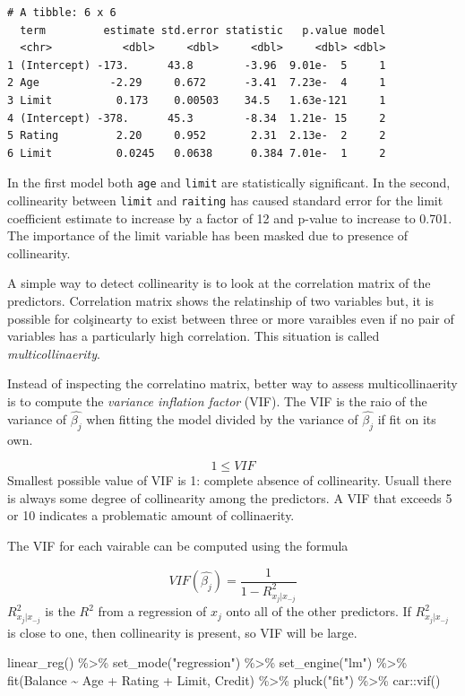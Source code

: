 \documentclass[
  letterpaper,
  DIV=11,
  numbers=noendperiod]{scrreprt}
\newenvironment{Shaded}{\begin{snugshade}}{\end{snugshade}}
\newcommand{\FunctionTok}[1]{\textcolor[rgb]{0.02,0.16,0.49}{#1}}
\newcommand{\NormalTok}[1]{\textcolor[rgb]{0.33,0.33,0.33}{#1}}
\newcommand{\SpecialCharTok}[1]{\textcolor[rgb]{0.00,0.46,0.62}{#1}}
\newcommand{\StringTok}[1]{\textcolor[rgb]{0.00,0.50,0.00}{#1}}
\begin{document}
\begin{verbatim}
# A tibble: 6 x 6
  term         estimate std.error statistic   p.value model
  <chr>           <dbl>     <dbl>     <dbl>     <dbl> <dbl>
1 (Intercept) -173.      43.8        -3.96  9.01e-  5     1
2 Age           -2.29     0.672      -3.41  7.23e-  4     1
3 Limit          0.173    0.00503    34.5   1.63e-121     1
4 (Intercept) -378.      45.3        -8.34  1.21e- 15     2
5 Rating         2.20     0.952       2.31  2.13e-  2     2
6 Limit          0.0245   0.0638      0.384 7.01e-  1     2
\end{verbatim}

In the first model both \texttt{age} and \texttt{limit} are
statistically significant. In the second, collinearity between
\texttt{limit} and \texttt{raiting} has caused standard error for the
limit coefficient estimate to increase by a factor of 12 and p-value to
increase to 0.701. The importance of the limit variable has been masked
due to presence of collinearity.

A simple way to detect collinearity is to look at the correlation matrix
of the predictors. Correlation matrix shows the relatinship of two
variables but, it is possible for colşinearty to exist between three or
more varaibles even if no pair of variables has a particularly high
correlation. This situation is called \emph{multicollinaerity}.

Instead of inspecting the correlatino matrix, better way to assess
multicollinaerity is to compute the \emph{variance inflation factor}
(VIF). The VIF is the raio of the variance of \(\hat{\beta_j}\) when
fitting the model divided by the variance of \(\hat{\beta_j}\) if fit on
its own.

\[
1 \leq VIF
\] Smallest possible value of VIF is 1: complete absence of
collinearity. Usuall there is always some degree of collinearity among
the predictors. A VIF that exceeds 5 or 10 indicates a problematic
amount of collinaerity.

The VIF for each vairable can be computed using the formula

\[
VIF(\hat{\beta_j}) = \frac{1}{1-R^2_{x_j | x_{-j}}}
\] \(R^2_{x_j | x_{-j}}\) is the \(R^2\) from a regression of \(x_j\)
onto all of the other predictors. If \(R^2_{x_j | x_{-j}}\) is close to
one, then collinearity is present, so VIF will be large.

\begin{Shaded}
\begin{Highlighting}[]
\FunctionTok{linear\_reg}\NormalTok{() }\SpecialCharTok{\%\textgreater{}\%} 
  \FunctionTok{set\_mode}\NormalTok{(}\StringTok{"regression"}\NormalTok{) }\SpecialCharTok{\%\textgreater{}\%} 
  \FunctionTok{set\_engine}\NormalTok{(}\StringTok{"lm"}\NormalTok{) }\SpecialCharTok{\%\textgreater{}\%} 
  \FunctionTok{fit}\NormalTok{(Balance }\SpecialCharTok{\textasciitilde{}}\NormalTok{ Age }\SpecialCharTok{+}\NormalTok{ Rating }\SpecialCharTok{+}\NormalTok{ Limit, Credit) }\SpecialCharTok{\%\textgreater{}\%} 
  \FunctionTok{pluck}\NormalTok{(}\StringTok{"fit"}\NormalTok{) }\SpecialCharTok{\%\textgreater{}\%} 
\NormalTok{  car}\SpecialCharTok{::}\FunctionTok{vif}\NormalTok{() }
\end{Highlighting}
\end{Shaded}
\end{document}
